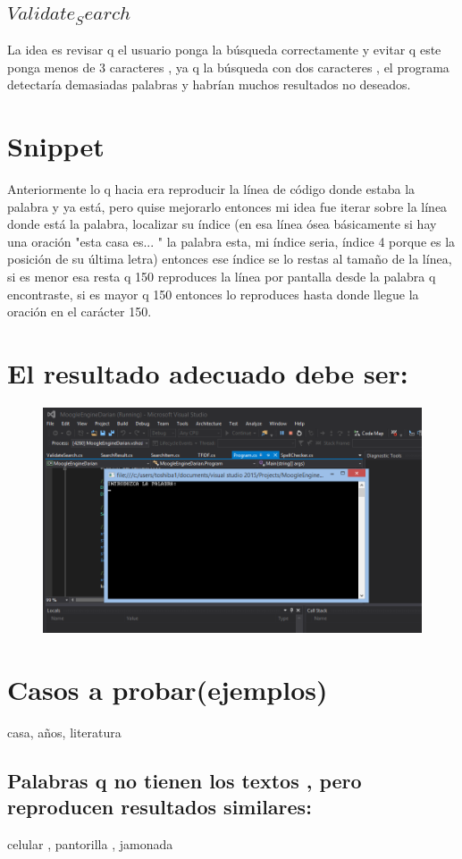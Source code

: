 \documentclass[12pt,a4paper]{article}
\begin{document}
\subsection{$Validate_Search$}
La idea es revisar q el usuario ponga la búsqueda correctamente y evitar q este ponga menos de 3 caracteres , ya q la búsqueda con dos caracteres , el programa detectaría demasiadas palabras y habrían muchos resultados no deseados.
\section{Snippet}
Anteriormente lo q hacia era reproducir la línea de código donde estaba la palabra y ya está, pero quise mejorarlo entonces mi idea fue iterar sobre la línea donde está la palabra, localizar su índice (en esa línea ósea básicamente si hay una oración "esta casa es... " la palabra esta, mi índice seria,  índice 4 porque es  la posición de su última letra)  entonces ese índice se lo restas al tamaño de la línea, si es menor esa resta q 150 reproduces la línea por pantalla desde la palabra q encontraste, si es mayor q 150 entonces lo reproduces hasta donde llegue la oración en el carácter  150.
\section{El resultado adecuado debe ser: }
\begin{figure}[H]
\centering
\includegraphics[scale=0.5]{Segundo}
\end{figure}
\section{Casos a probar(ejemplos)}
casa,
años,
literatura
\subsection{Palabras q no tienen los textos , pero reproducen  resultados similares:}
celular ,
pantorilla ,
jamonada
\end{document}
